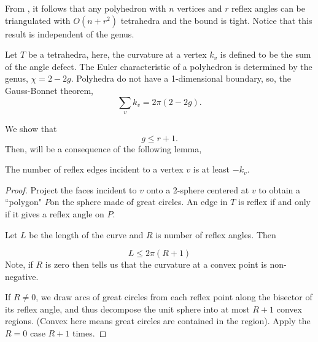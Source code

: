 From , it follows that any polyhedron
with $n$ vertices and $r$ reflex angles
can be triangulated with $O(n+r^2)$ tetrahedra 
and the bound is tight. Notice that this result is independent
of the genus.

Let $T$ be a tetrahedra, here, the curvature at a vertex $k_v$ is defined to
be the sum of the angle defect.
The Euler characteristic of a polyhedron is determined by the genus,
$\chi=2-2g$.
Polyhedra do not have a 1-dimensional boundary, 
so, the Gauss-Bonnet theorem,
$$\sum_vk_v=2\pi (2-2g).$$

We show that
$$g\leq r+1.$$ 
Then,  will be a consequence of the following
lemma,

\begin{lemma}\label{lem:reflex-edge}
The number of reflex edges  incident to a vertex $v$  is at least $-k_v.$
\end{lemma}

\begin{proof}
Project the faces incident to $v$ onto a 2-sphere centered at $v$
to obtain a ``polygon" $P$on the sphere made  of great circles.
An edge in $T$ is reflex if and only if it gives  a reflex angle on $P$.

Let $L$ be the length of the curve and $R$ is  number of reflex  angles.
Then

\begin{equation} \label{eqn:length-reflex}
L\leq 2\pi (R+1)
\end{equation}
Note, if $R$ is zero then 
tells us that the curvature at a convex point is non-negative.

If $R\neq 0$, we draw arcs of great circles from each reflex point
along the bisector of its reflex angle, and thus decompose the unit sphere
into at most $R+1$ convex regions. (Convex here means
great circles are contained in the region).
Apply the $R=0$ case $R+1$ times.

\end{proof}



